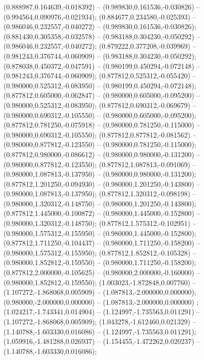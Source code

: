  (0.888987,0.164639,-0.018392) -- (0.989830,0.161536,-0.030826) -- (0.994564,0.090976,-0.021934);
 (0.884677,0.234580,-0.025393) -- (0.986046,0.232557,-0.040272) -- (0.989830,0.161536,-0.030826);
 (0.881430,0.305358,-0.032578) -- (0.983188,0.304230,-0.050292) -- (0.986046,0.232557,-0.040272);
 (0.879222,0.377208,-0.039969) -- (0.981243,0.376744,-0.060909) -- (0.983188,0.304230,-0.050292);
 (0.878038,0.450372,-0.047591) -- (0.980199,0.450294,-0.072148) -- (0.981243,0.376744,-0.060909);
 (0.877812,0.525312,-0.055420) -- (0.980000,0.525312,-0.083950) -- (0.980199,0.450294,-0.072148);
 (0.877812,0.605000,-0.062847) -- (0.980000,0.605000,-0.095200) -- (0.980000,0.525312,-0.083950);
 (0.877812,0.690312,-0.069679) -- (0.980000,0.690312,-0.105550) -- (0.980000,0.605000,-0.095200);
 (0.877812,0.781250,-0.075918) -- (0.980000,0.781250,-0.115000) -- (0.980000,0.690312,-0.105550);
 (0.877812,0.877812,-0.081562) -- (0.980000,0.877812,-0.123550) -- (0.980000,0.781250,-0.115000);
 (0.877812,0.980000,-0.086612) -- (0.980000,0.980000,-0.131200) -- (0.980000,0.877812,-0.123550);
 (0.877812,1.087813,-0.091069) -- (0.980000,1.087813,-0.137950) -- (0.980000,0.980000,-0.131200);
 (0.877812,1.201250,-0.094930) -- (0.980000,1.201250,-0.143800) -- (0.980000,1.087813,-0.137950);
 (0.877812,1.320312,-0.098198) -- (0.980000,1.320312,-0.148750) -- (0.980000,1.201250,-0.143800);
 (0.877812,1.445000,-0.100872) -- (0.980000,1.445000,-0.152800) -- (0.980000,1.320312,-0.148750);
 (0.877812,1.575312,-0.102951) -- (0.980000,1.575312,-0.155950) -- (0.980000,1.445000,-0.152800);
 (0.877812,1.711250,-0.104437) -- (0.980000,1.711250,-0.158200) -- (0.980000,1.575312,-0.155950);
 (0.877812,1.852812,-0.105328) -- (0.980000,1.852812,-0.159550) -- (0.980000,1.711250,-0.158200);
 (0.877812,2.000000,-0.105625) -- (0.980000,2.000000,-0.160000) -- (0.980000,1.852812,-0.159550);
 (1.003023,-1.872848,0.007760) -- (1.107272,-1.868068,0.005909) -- (1.087813,-2.000000,0.000000);
 (0.980000,-2.000000,0.000000) -- (1.087813,-2.000000,0.000000) ;
 (1.024217,-1.743341,0.014904) -- (1.124997,-1.735563,0.011291) -- (1.107272,-1.868068,0.005909);
 (1.043278,-1.612460,0.021329) -- (1.140788,-1.603330,0.016086) -- (1.124997,-1.735563,0.011291);
 (1.059916,-1.481288,0.026937) -- (1.154455,-1.472262,0.020237) -- (1.140788,-1.603330,0.016086);
